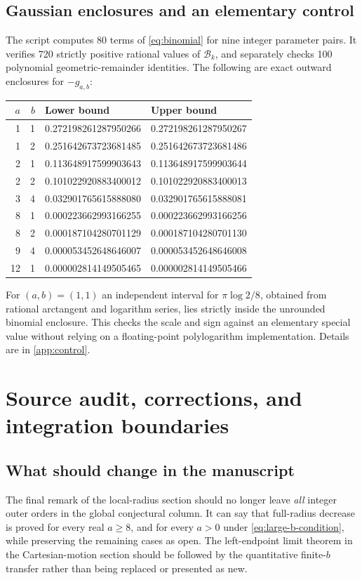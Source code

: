 \documentclass[11pt,letterpaper]{article}
\numberwithin{equation}{section}
\theoremstyle{definition}
\theoremstyle{remark}
\begin{document}
\subsection{Gaussian enclosures and an elementary control}
The script  computes 80 terms of
\eqref{eq:binomial} for nine integer parameter pairs. It verifies 720
strictly positive rational values of $\mathcal B_k$, and separately
checks 100 polynomial geometric-remainder identities. The following
are exact outward enclosures for $-g_{a,b}$:
\begin{center}
\small
\begin{tabular}{@{}rrll@{}}
\toprule
$a$&$b$&Lower bound&Upper bound\\
\midrule
1&1&0.272198261287950266&0.272198261287950267\\
1&2&0.251642673723681485&0.251642673723681486\\
2&1&0.113648917599903643&0.113648917599903644\\
2&2&0.101022920883400012&0.101022920883400013\\
3&4&0.032901765615888080&0.032901765615888081\\
8&1&0.000223662993166255&0.000223662993166256\\
8&2&0.000187104280701129&0.000187104280701130\\
9&4&0.000053452648646007&0.000053452648646008\\
12&1&0.000002814149505465&0.000002814149505466\\
\bottomrule
\end{tabular}
\end{center}
For $(a,b)=(1,1)$ an independent interval for $\pi\log2/8$, obtained
from rational arctangent and logarithm series, lies strictly inside
the unrounded binomial enclosure. This checks the scale and sign
against an elementary special value without relying on a floating-point
polylogarithm implementation. Details are in \cref{app:control}.

\section{Source audit, corrections, and integration boundaries}
\label{sec:audit}
\subsection{What should change in the manuscript}
The final remark of the local-radius section should no longer leave
\emph{all} integer outer orders in the global conjectural column.
It can say that full-radius decrease is proved for every real $a\ge8$,
and for every $a>0$ under \eqref{eq:large-b-condition}, while preserving
the remaining cases as open. The left-endpoint limit theorem in the
Cartesian-motion section should be followed by the quantitative
finite-$b$ transfer rather than being replaced or presented as new.
\end{document}
